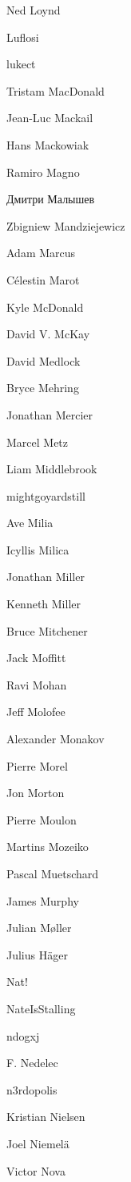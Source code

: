 \begin{DoxyItemize}
\item Ned Loynd
\item Luflosi
\item lukect
\item Tristam Mac\+Donald
\item Jean-\/\+Luc Mackail
\item Hans Mackowiak
\item Ramiro Magno
\item Дмитри Малышев
\item Zbigniew Mandziejewicz
\item Adam Marcus
\item Célestin Marot
\item Kyle Mc\+Donald
\item David V. Mc\+Kay
\item David Medlock
\item Bryce Mehring
\item Jonathan Mercier
\item Marcel Metz
\item Liam Middlebrook
\item mightgoyardstill
\item Ave Milia
\item Icyllis Milica
\item Jonathan Miller
\item Kenneth Miller
\item Bruce Mitchener
\item Jack Moffitt
\item Ravi Mohan
\item Jeff Molofee
\item Alexander Monakov
\item Pierre Morel
\item Jon Morton
\item Pierre Moulon
\item Martins Mozeiko
\item Pascal Muetschard
\item James Murphy
\item Julian Møller
\item Julius Häger
\item Nat!
\item Nate\+Is\+Stalling
\item ndogxj
\item F. Nedelec
\item n3rdopolis
\item Kristian Nielsen
\item Joel Niemelä
\item Victor Nova

\end{DoxyItemize}
